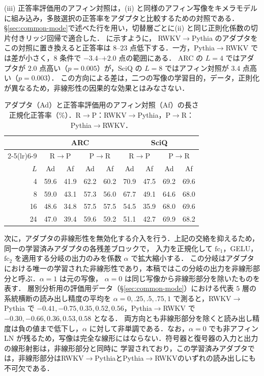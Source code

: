 \documentclass[techrep,noauthor]{ipsj}
\newcommand{\kw}[1]{#1}
\newcommand{\RtoP}{RWKV$\to$\allowbreak Pythia}
\newcommand{\PtoR}{Pythia$\to$\allowbreak RWKV}
\begin{document}
(iii) 正答率評価用のアフィン対照は，(ii) と同様のアフィン写像をキメラモデルに組み込み，多肢選択の正答率をアダプタと比較するための対照である．
\S\ref{sec:common-mode}で述べた行を用い，切替層ごとに(ii) と同じ正則化係数の切片付きリッジ回帰で適合した． に示すように，
\RtoP{} のアダプタをこの対照に置き換えると正答率は $8$--$23$ 点低下する．一方，\PtoR{} では差が小さく，$8$ 条件で $-3.4$--$+2.0$ 点の範囲にある．
ARC の $L{=}4$ ではアダプタが $2.0$ 点高い（$p{=}0.005$）が，SciQ の $L{=}8$ ではアフィン対照が $3.4$ 点高い（$p{=}0.003$）．
この方向による差は，二つの写像の学習目的，データ，正則化が異なるため，非線形性の因果的な効果とはみなさない．

\begin{table}[!t]\centering\small
\caption{アダプタ（Ad）と正答率評価用のアフィン対照（Af）の長さ正規化正答率（\%）．R$\to$P：RWKV$\to$Pythia，P$\to$R：Pythia$\to$RWKV．}\label{tab:bench}
\setlength{\tabcolsep}{2.4pt}
{
\begin{tabular}{rcccccccc}\toprule
& \multicolumn{4}{c}{ARC} & \multicolumn{4}{c}{SciQ}\\
\cmidrule(lr){2-5}\cmidrule(lr){6-9}
& \multicolumn{2}{c}{R$\to$P} & \multicolumn{2}{c}{P$\to$R}
& \multicolumn{2}{c}{R$\to$P} & \multicolumn{2}{c}{P$\to$R}\\
$L$ & Ad & Af & Ad & Af & Ad & Af & Ad & Af\\\midrule
4  & 59.6 & 41.9 & 62.2 & 60.2 & 70.9 & 47.5 & 69.2 & 69.6\\
8  & 59.0 & 43.1 & 57.3 & 56.0 & 67.7 & 49.1 & 64.6 & 68.0\\
16 & 48.6 & 34.8 & 57.5 & 57.5 & 54.5 & 35.9 & 68.0 & 69.6\\
24 & 47.0 & 39.4 & 59.6 & 59.2 & 51.1 & 42.7 & 69.9 & 68.2\\\bottomrule
\end{tabular}}
\end{table}

次に，アダプタの非線形性を無効化する介入を行う．上記の交絡を抑えるため，\kw{同一の学習済みアダプタ}の各残差ブロックで，
入力を正規化して $\mathrm{fc}_1$，GELU，$\mathrm{fc}_2$ を適用する分岐の出力のみを係数 $\alpha$ で拡大縮小する．
この分岐はアダプタにおける唯一の学習された非線形性であり，本稿ではこの分岐の出力を非線形部分と呼ぶ．$\alpha{=}1$ は元の写像，
$\alpha{=}0$ は同じ写像から非線形部分を除いたものを表す．
層別分析用の評価用データ（\S\ref{sec:common-mode}）における代表 $5$ 層の系統横断の読み出し精度の平均を $\alpha=0,.25,.5,.75,1$ で測ると，\RtoP{} で
$-0.41,-0.75,0.35,0.52,0.56$，\PtoR{} で $-0.30,-0.66,0.36,0.53,0.58$ となる．
両方向とも非線形部分を除くと読み出し精度は負の値まで低下し，$\alpha$ に対して非単調である．なお，$\alpha{=}0$ でも非アフィン LN が残るため，写像は完全な線形にはならない．符号器と復号器の入力と出力の線形射影は，非線形部分と同時に
学習されており，\kw{この学習済みアダプタでは，非線形部分は\RtoP{}と\PtoR{}のいずれの読み出しにも不可欠}である．
\end{document}
